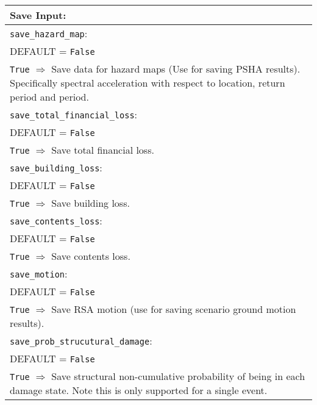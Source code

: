 \vspace{2em}
\begin{tabular}{|p{\textwidth}|}
\hline
\vspace{0.3em} \noindent \Large \textbf{Save Input:} \normalsize \\
\hline \vspace{0.1em} \texttt{save\_hazard\_map}: \\
DEFAULT = \texttt{False} \\
\texttt{True} $\Rightarrow$ Save data for hazard maps (Use for saving
PSHA results). Specifically spectral acceleration with respect to
location, return period and period.\\
\hline \vspace{0.1em} \texttt{save\_total\_financial\_loss}: \\
DEFAULT = \texttt{False} \\
\texttt{True} $\Rightarrow$ Save total financial loss. \\
 \hline
\vspace{0.1em} \texttt{save\_building\_loss}: \\
DEFAULT = \texttt{False} \\
\texttt{True} $\Rightarrow$ Save building loss. \\
 \hline
\vspace{0.1em} \texttt{save\_contents\_loss}: \\
DEFAULT = \texttt{False} \\
 \texttt{True} $\Rightarrow$ Save contents loss. \\
\hline \vspace{0.1em} \texttt{save\_motion}: \\
DEFAULT = \texttt{False} \\
\texttt{True} $\Rightarrow$ Save RSA motion (use for saving scenario ground
motion results). \\
\hline \vspace{0.1em} \texttt{save\_prob\_strucutural\_damage}: \\
DEFAULT = \texttt{False} \\
\texttt{True} $\Rightarrow$ Save structural non-cumulative
probability of being in each
damage state.  Note this is only supported for a single event. \\
\hline
 \end{tabular}
 
